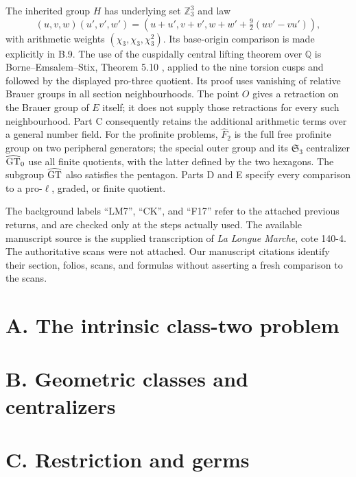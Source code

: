 \documentclass[11pt,a4paper]{article}
\newcommand{\Z}{\mathbb Z}
\newcommand{\Q}{\mathbb Q}
\begin{document}
The inherited group $H$ has underlying set $\Z_3^3$ and law
\[
 (u,v,w)(u',v',w')=
 (u+u',v+v',w+w'+\tfrac92(uv'-vu')),
\]
with arithmetic weights $(\chi_3,\chi_3,\chi_3^2)$.
Its base-origin comparison is made explicitly in B.9.
The use of the cuspidally central lifting theorem over $\Q$
is Borne--Emsalem--Stix, Theorem 5.10
\cite{BES2015}, applied to the nine torsion cusps and followed
by the displayed pro-three quotient. Its proof uses vanishing
of relative Brauer groups in all section neighbourhoods.
The point $O$ gives a retraction on the Brauer group of $E$
itself; it does not supply those retractions for every such
neighbourhood. Part C consequently retains the additional
arithmetic terms over a general number field.
For the profinite problems, $\widehat F_2$ is the full free
profinite group on two peripheral generators; the special
outer group and its $\mathfrak S_3$ centralizer
$\widehat{\rm GT}_0$ use all finite quotients, with the latter
defined by the two hexagons. The subgroup $\widehat{\rm GT}$
also satisfies the pentagon. Parts D and E specify every
comparison to a pro-$\ell$, graded, or finite quotient.

The background labels ``LM7'', ``CK'', and ``F17'' refer to the
attached previous returns, and are checked only at the steps
actually used. The available manuscript source is the supplied
transcription of \emph{La Longue Marche}, cote 140-4.
The authoritative scans were not attached. Our manuscript
citations identify their section, folios, scans, and formulas
without asserting a fresh comparison to the scans.
\section{A. The intrinsic class-two problem}
\section{B. Geometric classes and centralizers}
\section{C. Restriction and germs}
\end{document}
